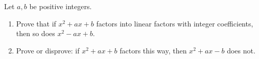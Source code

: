 Let $a,b$ be positive integers.
\begin{enumerate}
\item Prove that if $x^2+ax+b$ factors into linear factors with integer coefficients, then so does $x^2-ax+b$.
\item Prove or disprove: if $x^2+ax+b$ factors this way, then $x^2+ax-b$ does not.
\end{enumerate}
